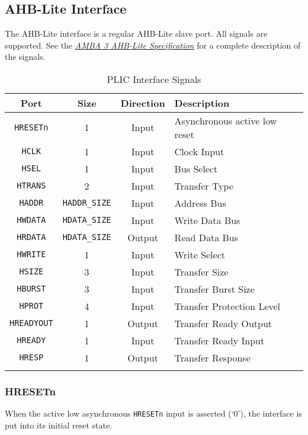 \subsection{AHB-Lite Interface}

The AHB-Lite interface is a regular AHB-Lite slave port. All signals are
supported. See the
\emph{\href{https://www.arm.com/products/system-ip/amba-specifications}{AMBA
3 AHB-Lite Specification}} for a complete description of the signals.

\begin{table}[h]
	\begin{tabular*}{0.75\textwidth}{@{\extracolsep{\fill}}cccl}	
		\thickhline 
		\textbf{Port} & \textbf{Size} & \textbf{Direction} & \textbf{Description}\\
		\hline 
		\texttt{HRESETn} & 1 & Input & Asynchronous active low reset\\
		\texttt{HCLK} & 1 & Input & Clock Input\\
		\texttt{HSEL} & 1 & Input & Bus Select\\
		\texttt{HTRANS} & 2 & Input & Transfer Type\\
		\texttt{HADDR} & \texttt{HADDR\_SIZE} & Input & Address Bus\\
		\texttt{HWDATA} & \texttt{HDATA\_SIZE} & Input & Write Data Bus\\
		\texttt{HRDATA} & \texttt{HDATA\_SIZE} & Output & Read Data Bus\\
		\texttt{HWRITE} & 1 & Input & Write Select\\
		\texttt{HSIZE} & 3 & Input & Transfer Size\\
		\texttt{HBURST} & 3 & Input & Transfer Burst Size\\
		\texttt{HPROT} & 4 & Input & Transfer Protection Level\\
		\texttt{HREADYOUT} & 1 & Output & Transfer Ready Output\\
		\texttt{HREADY} & 1 & Input & Transfer Ready Input\\
		\texttt{HRESP} & 1 & Output & Transfer Response\\
		\thickhline 	
	\end{tabular*} 
	\caption{PLIC Interface Signals}
	\label{tab:AHBIF}
\end{table}

\subsubsection{HRESETn}

When the active low asynchronous \texttt{HRESETn} input is asserted
(`0'), the interface is put into its initial reset state.

